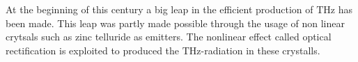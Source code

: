 
At the beginning of this century a big leap in the efficient production of $\si{\tera\hertz}$ has been made.
This leap was partly made possible through the usage of non linear crytsals such as zinc telluride as emitters.
The nonlinear effect called optical rectification is exploited to produced the $\si{\tera\hertz}$-radiation in these crystalls.


